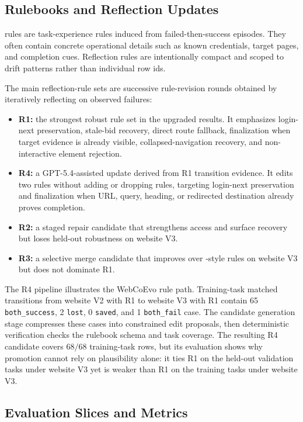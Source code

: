 \subsection{Rulebooks and Reflection Updates}

\expel{} rules are task-experience rules induced from failed-then-success episodes. They often contain concrete operational details such as known credentials, target pages, and completion cues. Reflection rules are intentionally compact and scoped to drift patterns rather than individual row ids.

The main reflection-rule sets are successive rule-revision rounds obtained by iteratively reflecting on observed failures:
\begin{itemize}
\item \textbf{R1:} the strongest robust rule set in the upgraded results. It emphasizes login-next preservation, stale-bid recovery, direct route fallback, finalization when target evidence is already visible, collapsed-navigation recovery, and non-interactive element rejection.
\item \textbf{R4:} a GPT-5.4-assisted update derived from R1 transition evidence. It edits two rules without adding or dropping rules, targeting login-next preservation and finalization when URL, query, heading, or redirected destination already proves completion.
\item \textbf{R2:} a staged repair candidate that strengthens access and surface recovery but loses held-out robustness on website V3.
\item \textbf{R3:} a selective merge candidate that improves over \expel{}-style rules on website V3 but does not dominate R1.
\end{itemize}

The R4 pipeline illustrates the WebCoEvo rule path. Training-task matched transitions from website V2 with R1 to website V3 with R1 contain 65 \texttt{both\_success}, 2 \texttt{lost}, 0 \texttt{saved}, and 1 \texttt{both\_fail} case. The candidate generation stage compresses these cases into constrained edit proposals, then deterministic verification checks the rulebook schema and task coverage. The resulting R4 candidate covers \(68/68\) training-task rows, but its evaluation shows why promotion cannot rely on plausibility alone: it ties R1 on the held-out validation tasks under website V3 yet is weaker than R1 on the training tasks under website V3.

\subsection{Evaluation Slices and Metrics}

